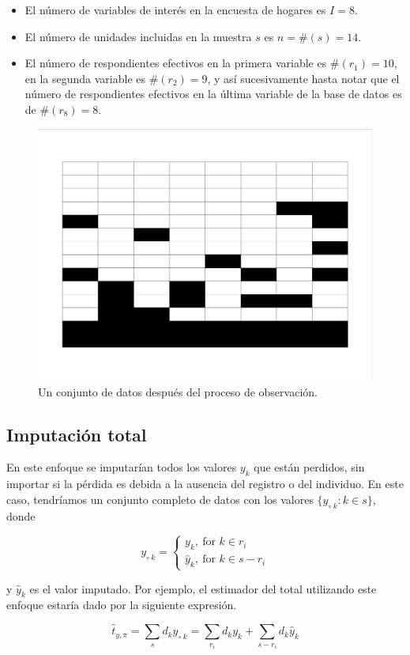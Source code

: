 \documentclass[
  12pt,
]{book}
\providecommand{\tightlist}{%
  \setlength{\itemsep}{0pt}\setlength{\parskip}{0pt}}
\begin{document}
\begin{itemize}
\tightlist
\item
  El número de variables de interés en la encuesta de hogares es \(I=8\).
\item
  El número de unidades incluidas en la muestra \(s\) es \(n=\#(s)=14\).
\item
  El número de respondientes efectivos en la primera variable es \(\#(r_1)=10\), en la segunda variable es \(\#(r_2)=9\), y así sucesivamente hasta notar que el número de respondientes efectivos en la última variable de la base de datos es de \(\#(r_8)=8\).
\end{itemize}

\begin{figure}
\includegraphics[width=0.5\linewidth]{Pics/j1} \caption{Un conjunto de datos después del proceso de observación.}\label{fig:figbaseincom}
\end{figure}

\hypertarget{imputaciuxf3n-total}{%
\subsection{Imputación total}\label{imputaciuxf3n-total}}

En este enfoque se imputarían todos los valores \(y_k\) que están perdidos, sin importar si la pérdida es debida a la ausencia del registro o del individuo. En este caso, tendríamos un conjunto completo de datos con los valores \(\{y_{\circ \  k}: k\in s\}\), donde

\[
y_{\circ \  k} = 
\begin{cases}
y_k, \ \text{for $k \in r_i$} \\
\hat{y}_k, \ \text{for $k \in s - r_i$}
\end{cases}
\]

y \(\hat{y}_k\) es el valor imputado. Por ejemplo, el estimador del total utilizando este enfoque estaría dado por la siguiente expresión.

\[
\hat{t}_{y,\pi} = \sum_s d_{k}y_{\circ \  k}
= \sum_{r_i}d_{k}y_k + \sum_{s - r_i}d_{k}\hat{y}_k
\]
\end{document}
